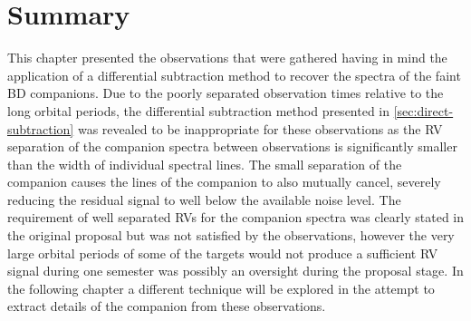 \section{Summary}
This chapter presented the observations that were gathered having in mind the application of a differential subtraction method to recover the spectra of the faint {BD} companions.
Due to the poorly separated observation times relative to the long orbital periods, the differential subtraction method presented in \cref{sec:direct-subtraction} was revealed to be inappropriate for these observations as the {RV} separation of the companion spectra between observations is significantly smaller than the width of individual spectral lines.
The small separation of the companion causes the lines of the companion to also mutually cancel, severely reducing the residual signal to well below the available noise level.
The requirement of well separated {RV}s for the companion spectra was clearly stated in the original proposal but was not satisfied by the observations, however the very large orbital periods of some of the targets would not produce a sufficient {RV} signal during one semester was possibly an oversight during the proposal stage.
In the following chapter a different technique will be explored in the attempt to extract details of the companion from these observations.
